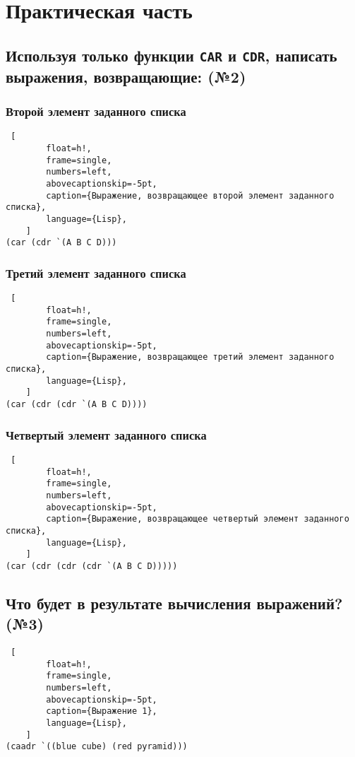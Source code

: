 \chapter{Практическая часть}


\section{Используя только функции \texttt{CAR} и \texttt{CDR}, написать выражения, возвращающие: (№2)}

\subsection{Второй элемент заданного списка}

\begin{lstlisting} [
		float=h!,
		frame=single,
		numbers=left,
		abovecaptionskip=-5pt,
		caption={Выражение, возвращающее второй элемент заданного списка},
		language={Lisp},
	]
(car (cdr `(A B C D)))
\end{lstlisting}

\subsection{Третий элемент заданного списка}

\begin{lstlisting} [
		float=h!,
		frame=single,
		numbers=left,
		abovecaptionskip=-5pt,
		caption={Выражение, возвращающее третий элемент заданного списка},
		language={Lisp},
	]
(car (cdr (cdr `(A B C D))))
\end{lstlisting}

\subsection{Четвертый элемент заданного списка}

\begin{lstlisting} [
		float=h!,
		frame=single,
		numbers=left,
		abovecaptionskip=-5pt,
		caption={Выражение, возвращающее четвертый элемент заданного списка},
		language={Lisp},
	]
(car (cdr (cdr (cdr `(A B C D)))))
\end{lstlisting}

\section{Что будет в результате вычисления выражений? (№3)}


\begin{lstlisting} [
		float=h!,
		frame=single,
		numbers=left,
		abovecaptionskip=-5pt,
		caption={Выражение 1},
		language={Lisp},
	]
(caadr `((blue cube) (red pyramid)))
\end{lstlisting}

